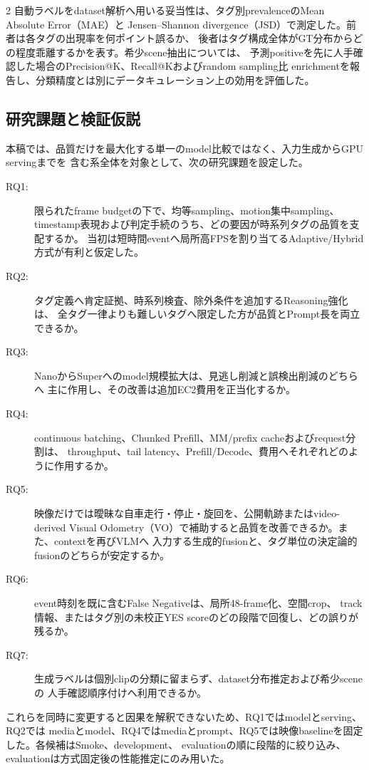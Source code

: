 \documentclass[9pt,a4paper]{extarticle}
\begin{document}
\begin{multicols}{2}
自動ラベルをdataset解析へ用いる妥当性は、タグ別prevalenceのMean Absolute Error（MAE）と
Jensen--Shannon divergence（JSD）で測定した。前者は各タグの出現率を何ポイント誤るか、
後者はタグ構成全体がGT分布からどの程度乖離するかを表す。希少scene抽出については、
予測positiveを先に人手確認した場合のPrecision@K、Recall@Kおよびrandom sampling比
enrichmentを報告し、分類精度とは別にデータキュレーション上の効用を評価した。

\subsection{研究課題と検証仮説}
本稿では、品質だけを最大化する単一のmodel比較ではなく、入力生成からGPU servingまでを
含む系全体を対象として、次の研究課題を設定した。
\begin{description}
  \item[RQ1:] 限られたframe budgetの下で、均等sampling、motion集中sampling、
        timestamp表現および判定手続のうち、どの要因が時系列タグの品質を支配するか。
        当初は短時間eventへ局所高FPSを割り当てるAdaptive/Hybrid方式が有利と仮定した。
  \item[RQ2:] タグ定義へ肯定証拠、時系列検査、除外条件を追加するReasoning強化は、
        全タグ一律よりも難しいタグへ限定した方が品質とPrompt長を両立できるか。
  \item[RQ3:] NanoからSuperへのmodel規模拡大は、見逃し削減と誤検出削減のどちらへ
        主に作用し、その改善は追加EC2費用を正当化するか。
  \item[RQ4:] continuous batching、Chunked Prefill、MM/prefix cacheおよびrequest分割は、
        throughput、tail latency、Prefill/Decode、費用へそれぞれどのように作用するか。
  \item[RQ5:] 映像だけでは曖昧な自車走行・停止・旋回を、公開軌跡またはvideo-derived
        Visual Odometry（VO）で補助すると品質を改善できるか。また、contextを再びVLMへ
        入力する生成的fusionと、タグ単位の決定論的fusionのどちらが安定するか。
  \item[RQ6:] event時刻を既に含むFalse Negativeは、局所48-frame化、空間crop、
        track情報、またはタグ別の未校正YES scoreのどの段階で回復し、どの誤りが残るか。
  \item[RQ7:] 生成ラベルは個別clipの分類に留まらず、dataset分布推定および希少sceneの
        人手確認順序付けへ利用できるか。
\end{description}
これらを同時に変更すると因果を解釈できないため、RQ1ではmodelとserving、RQ2では
mediaとmodel、RQ4ではmediaとprompt、RQ5では映像baselineを固定した。各候補はSmoke、development、
evaluationの順に段階的に絞り込み、evaluationは方式固定後の性能推定にのみ用いた。


\end{multicols}
\end{document}
